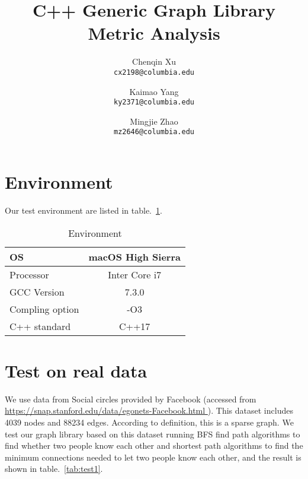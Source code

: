 \documentclass{article}
\title{C++ Generic Graph Library Metric Analysis}
\author{Chenqin Xu\\
	{\tt\small cx2198@columbia.edu}
	\and
	Kaimao Yang\\
	{\tt\small ky2371@columbia.edu}
	\and
	Mingjie Zhao\\
	{\tt\small mz2646@columbia.edu}
}
\begin{document}
    \maketitle

    \tableofcontents
    
    \newpage
    \section{Environment}
    Our test environment are listed in table.~\ref{tab:env}.
    	\begin{table}
    	\begin{center}
    		\begin{tabular}{|l|c|}
    			\hline
				OS & macOS High Sierra\\
				\hline 
				Processor & Inter Core i7\\
				\hline
    			GCC Version & 7.3.0 \\
    			\hline
    			Compling option  & -O3 \\
    			\hline
    			C++ standard & C++17 \\
    			\hline
    		\end{tabular}
    	\end{center}
    	\caption{Environment}
    	\label{tab:env}
    \end{table}
   \section{Test on real data}
   We use data from Social circles provided by Facebook (accessed from \url{https://snap.stanford.edu/data/egonets-Facebook.html
   }). This dataset includes 4039 nodes and 88234 edges. According to definition, this is a sparse graph. We test our graph library based on this dataset running BFS find path algorithms to find whether two people know each other and shortest path algorithms to find the minimum connections needed to let two people know each other, and the result is shown in table.~\ref{tab:test1}.
\end{document}
